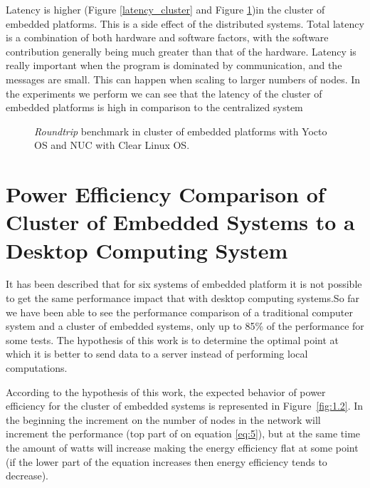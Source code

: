Latency is higher (Figure \ref{latency_cluster} and Figure
\ref{roundtrip_cluster})in the cluster of embedded platforms.  This is a side
effect of the distributed systems.  Total latency is a combination of both
hardware and software factors, with the software contribution generally being
much greater than that of the hardware. Latency is really important when the
program is dominated by communication, and the messages are small.  This can
happen when scaling to larger numbers of nodes. In the experiments we perform we
can see that the latency of the cluster of embedded platforms is high in
comparison to the centralized system \cite{NUC} 

\begin{figure}[H]
\begin{center}
\end{center}
\caption{\textit{Roundtrip} benchmark in cluster of embedded platforms with Yocto OS and NUC
with Clear Linux OS.}
\label{roundtrip_cluster}
\end{figure}

\section{Power Efficiency Comparison of Cluster of Embedded Systems to a
Desktop Computing System}

It has been described that for six systems of embedded platform it is not
possible to get the same performance impact that with desktop computing
systems.So far we have been able to see the performance comparison of a traditional
computer system and a cluster of embedded systems, only up to 85\% of the
performance for some tests. The hypothesis of this work is to determine the
optimal point at which it is better to send data to a server instead of
performing local computations.


According to the hypothesis of this work, the expected behavior of power
efficiency for the cluster of embedded systems is represented in
Figure~\ref{fig:1.2}. In the beginning the increment on the
number of nodes in the network will increment the performance (top part of
on equation \ref{eq:5}), but at the same time the amount of watts will
increase making the energy efficiency flat at some point (if the lower part of
the equation increases then energy efficiency tends to decrease).

